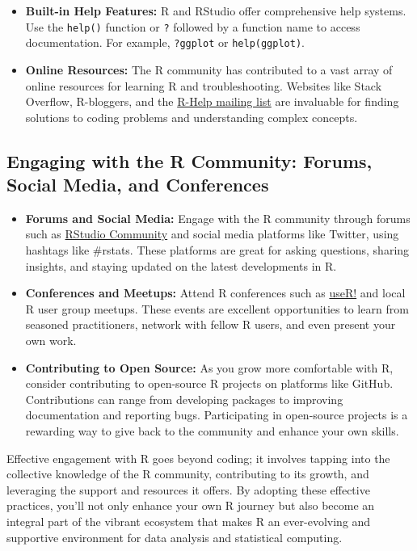 \documentclass[
]{book}
\begin{document}
\begin{itemize}
\item
  \textbf{Built-in Help Features:} R and RStudio offer comprehensive help systems. Use the \texttt{help()} function or \texttt{?} followed by a function name to access documentation. For example, \texttt{?ggplot} or \texttt{help(ggplot)}.
\item
  \textbf{Online Resources:} The R community has contributed to a vast array of online resources for learning R and troubleshooting. Websites like Stack Overflow, R-bloggers, and the \href{https://stat.ethz.ch/mailman/listinfo/r-help}{R-Help mailing list} are invaluable for finding solutions to coding problems and understanding complex concepts.
\end{itemize}

\subsection*{Engaging with the R Community: Forums, Social Media, and Conferences}\label{engaging-with-the-r-community-forums-social-media-and-conferences}

\begin{itemize}
\item
  \textbf{Forums and Social Media:} Engage with the R community through forums such as \href{https://community.rstudio.com/}{RStudio Community} and social media platforms like Twitter, using hashtags like \#rstats. These platforms are great for asking questions, sharing insights, and staying updated on the latest developments in R.
\item
  \textbf{Conferences and Meetups:} Attend R conferences such as \href{https://user2020.r-project.org/}{useR!} and local R user group meetups. These events are excellent opportunities to learn from seasoned practitioners, network with fellow R users, and even present your own work.
\item
  \textbf{Contributing to Open Source:} As you grow more comfortable with R, consider contributing to open-source R projects on platforms like GitHub. Contributions can range from developing packages to improving documentation and reporting bugs. Participating in open-source projects is a rewarding way to give back to the community and enhance your own skills.
\end{itemize}

Effective engagement with R goes beyond coding; it involves tapping into the collective knowledge of the R community, contributing to its growth, and leveraging the support and resources it offers. By adopting these effective practices, you'll not only enhance your own R journey but also become an integral part of the vibrant ecosystem that makes R an ever-evolving and supportive environment for data analysis and statistical computing.
\end{document}
